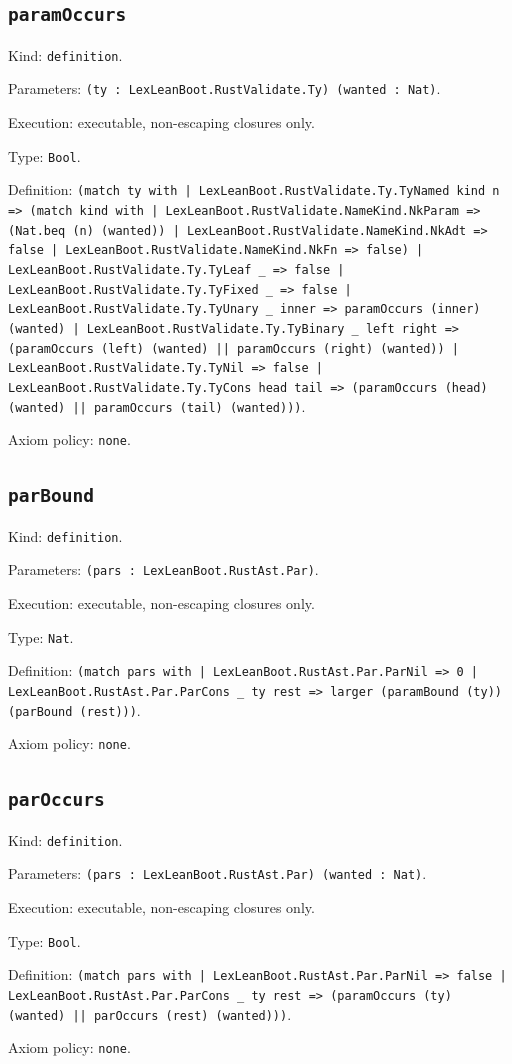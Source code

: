 \documentclass[11pt]{article}
\begin{document}
\subsection*{\texttt{paramOccurs}}
\noindent Kind: \texttt{definition}.\par
\noindent Parameters: \texttt{(ty : LexLeanBoot.RustValidate.Ty) (wanted : Nat)}.\par
\noindent Execution: executable, non-escaping closures only.\par
\noindent Type: \texttt{Bool}.\par
\noindent Definition: \texttt{(match ty with | LexLeanBoot.RustValidate.Ty.TyNamed kind n => (match kind with | LexLeanBoot.RustValidate.NameKind.NkParam => (Nat.beq (n) (wanted)) | LexLeanBoot.RustValidate.NameKind.NkAdt => false | LexLeanBoot.RustValidate.NameKind.NkFn => false) | LexLeanBoot.RustValidate.Ty.TyLeaf \_ => false | LexLeanBoot.RustValidate.Ty.TyFixed \_ => false | LexLeanBoot.RustValidate.Ty.TyUnary \_ inner => paramOccurs (inner) (wanted) | LexLeanBoot.RustValidate.Ty.TyBinary \_ left right => (paramOccurs (left) (wanted) || paramOccurs (right) (wanted)) | LexLeanBoot.RustValidate.Ty.TyNil => false | LexLeanBoot.RustValidate.Ty.TyCons head tail => (paramOccurs (head) (wanted) || paramOccurs (tail) (wanted)))}.\par
\noindent Axiom policy: \texttt{none}.\par
\subsection*{\texttt{parBound}}
\noindent Kind: \texttt{definition}.\par
\noindent Parameters: \texttt{(pars : LexLeanBoot.RustAst.Par)}.\par
\noindent Execution: executable, non-escaping closures only.\par
\noindent Type: \texttt{Nat}.\par
\noindent Definition: \texttt{(match pars with | LexLeanBoot.RustAst.Par.ParNil => 0 | LexLeanBoot.RustAst.Par.ParCons \_ ty rest => larger (paramBound (ty)) (parBound (rest)))}.\par
\noindent Axiom policy: \texttt{none}.\par
\subsection*{\texttt{parOccurs}}
\noindent Kind: \texttt{definition}.\par
\noindent Parameters: \texttt{(pars : LexLeanBoot.RustAst.Par) (wanted : Nat)}.\par
\noindent Execution: executable, non-escaping closures only.\par
\noindent Type: \texttt{Bool}.\par
\noindent Definition: \texttt{(match pars with | LexLeanBoot.RustAst.Par.ParNil => false | LexLeanBoot.RustAst.Par.ParCons \_ ty rest => (paramOccurs (ty) (wanted) || parOccurs (rest) (wanted)))}.\par
\noindent Axiom policy: \texttt{none}.\par
\end{document}
